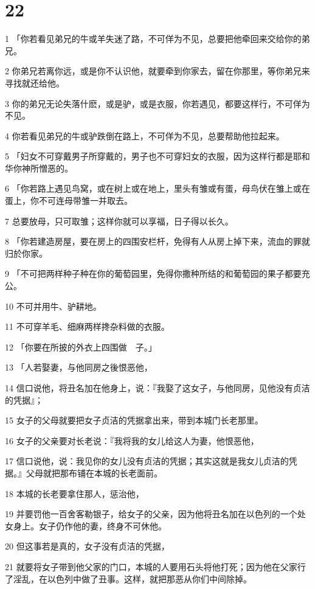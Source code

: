 \chapter{22}

\par 1 「你若看见弟兄的牛或羊失迷了路，不可佯为不见，总要把他牵回来交给你的弟兄。
\par 2 你弟兄若离你远，或是你不认识他，就要牵到你家去，留在你那里，等你弟兄来寻找就还给他。
\par 3 你的弟兄无论失落什麽，或是驴，或是衣服，你若遇见，都要这样行，不可佯为不见。
\par 4 你若看见弟兄的牛或驴跌倒在路上，不可佯为不见，总要帮助他拉起来。
\par 5 「妇女不可穿戴男子所穿戴的，男子也不可穿妇女的衣服，因为这样行都是耶和华你神所憎恶的。
\par 6 「你若路上遇见鸟窝，或在树上或在地上，里头有雏或有蛋，母鸟伏在雏上或在蛋上，你不可连母带雏一并取去。
\par 7 总要放母，只可取雏；这样你就可以享福，日子得以长久。
\par 8 「你若建造房屋，要在房上的四围安栏杆，免得有人从房上掉下来，流血的罪就归於你家。
\par 9 「不可把两样种子种在你的葡萄园里，免得你撒种所结的和葡萄园的果子都要充公。
\par 10 不可并用牛、驴耕地。
\par 11 不可穿羊毛、细麻两样搀杂料做的衣服。
\par 12 「你要在所披的外衣上四围做　子。」
\par 13 「人若娶妻，与他同房之後恨恶他，
\par 14 信口说他，将丑名加在他身上，说：『我娶了这女子，与他同房，见他没有贞洁的凭据』；
\par 15 女子的父母就要把女子贞洁的凭据拿出来，带到本城门长老那里。
\par 16 女子的父亲要对长老说：『我将我的女儿给这人为妻，他恨恶他，
\par 17 信口说他，说：我见你的女儿没有贞洁的凭据；其实这就是我女儿贞洁的凭据。』父母就把那布铺在本城的长老面前。
\par 18 本城的长老要拿住那人，惩治他，
\par 19 并要罚他一百舍客勒银子，给女子的父亲，因为他将丑名加在以色列的一个处女身上。女子仍作他的妻，终身不可休他。
\par 20 但这事若是真的，女子没有贞洁的凭据，
\par 21 就要将女子带到他父家的门口，本城的人要用石头将他打死；因为他在父家行了淫乱，在以色列中做了丑事。这样，就把那恶从你们中间除掉。
